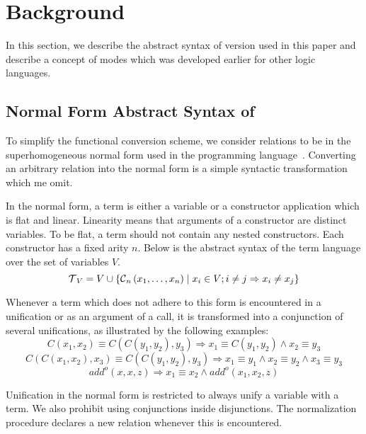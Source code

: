 \section{Background}

In this section, we describe the abstract syntax of \mk version used in this paper and describe a concept of modes which was developed earlier for other logic languages.

\subsection{Normal Form Abstract Syntax of \mk}

To simplify the functional conversion scheme, we consider \mk relations to be in the superhomogeneous normal form used in the \merc programming language~\cite{somogyi1996execution}. 
Converting an arbitrary \mk relation into the normal form is a simple syntactic transformation which me omit.

In the normal form, a term is either a variable or a constructor application which is flat and linear.
Linearity means that arguments of a constructor are distinct variables.
To be flat, a term should not contain any nested constructors.
Each constructor has a fixed arity $n$.
Below is the abstract syntax of the term language over the set of variables $V$.
\[  \operatorname{\mathcal{T}}_{V} = V \cup \{\operatorname{\mathcal{C}}_{n}\left( x_1, \ldots, x_{n} \right) \mid x_{i}\in V; i \neq j \Rightarrow x_i \neq x_j\} \]

Whenever a term which does not adhere to this form is encountered in a unification or as an argument of a call, it is transformed into a conjunction of several unifications, as illustrated by the following examples:
\[ C\left( x_1, x_2 \right) \equiv C\left( C\left( y_1, y_2 \right), y_3 \right) \Rightarrow x_1 \equiv C\left( y_1, y_2 \right) \land x_2 \equiv y_3   \]
\[ C\left( C\left( x_1, x_2 \right), x_3 \right) \equiv C\left( C\left( y_1, y_2 \right), y_3 \right) \Rightarrow x_1 \equiv y_1 \land x_2 \equiv y_2 \land x_3 \equiv y_3   \]
\[add^o\left( x, x, z \right) \Rightarrow x_1 \equiv x_2 \land add^o\left( x_1, x_2, z \right) \]

Unification in the normal form is restricted to always unify a variable with a term.
We also prohibit using conjunctions inside disjunctions.
The normalization procedure declares a new relation whenever this is encountered.



